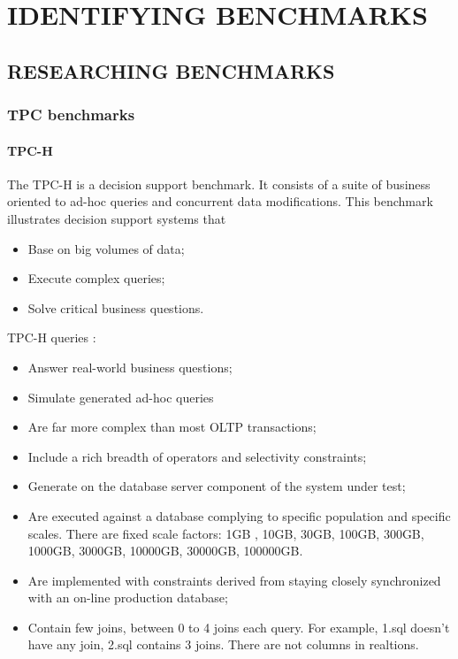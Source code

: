 
\chapter{IDENTIFYING BENCHMARKS}\label{chapter:Finding benchmarks}

\section{RESEARCHING BENCHMARKS}

\subsection{TPC benchmarks}

\subsubsection{TPC-H}

The TPC-H \cite{TPC} is a decision support benchmark. It consists of a suite of business oriented to ad-hoc queries and concurrent data modifications. This benchmark illustrates decision support systems that

\begin{itemize}
	\item Base on big volumes of data;
	\item Execute complex queries;
	\item Solve critical business questions.
\end{itemize}

TPC-H queries :

\begin{itemize}
	\item Answer real-world business questions;
	\item Simulate generated ad-hoc queries 
	\item Are far more complex than most OLTP transactions;
	\item Include a rich breadth of operators and selectivity constraints;
	\item Generate on the database server component of the system under test;
	\item Are executed against a database complying to specific population and specific scales. There are fixed scale factors: 1GB
	, 10GB, 30GB, 100GB, 300GB, 1000GB, 3000GB, 10000GB, 30000GB, 100000GB. 
	\item Are implemented with constraints derived from staying closely synchronized with an on-line production database;
	\item Contain few joins, between 0 to 4 joins each query. For example, 1.sql doesn't have any join, 2.sql contains 3 joins. There are not
	columns in realtions.
\end{itemize}

